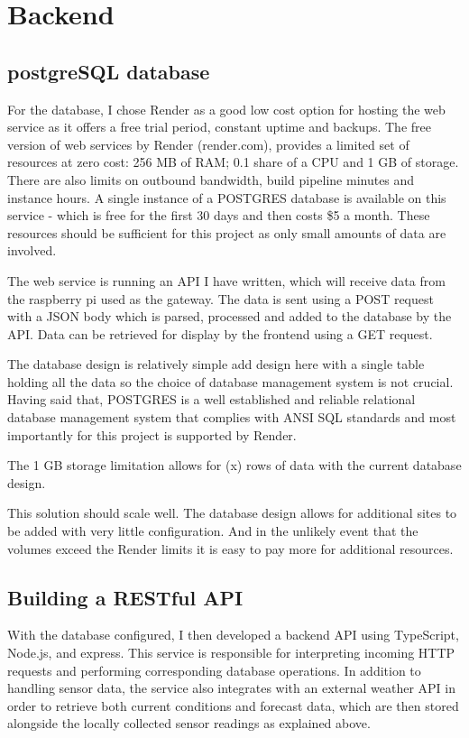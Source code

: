 \section{Backend}

\subsection{postgreSQL database}

For the database, I chose Render as a good low cost option for hosting the web
service as it offers a free trial period, constant uptime and backups. The free
version of web services by Render (render.com), provides a limited set of
resources at zero cost: 256 MB of RAM; 0.1 share of a CPU and 1 GB of storage.
There are also limits on outbound bandwidth, build pipeline minutes and instance
hours. A single instance of a POSTGRES database is available on this service -
which is free for the first 30 days and then costs \$5 a month. These resources
should be sufficient for this project as only small amounts of data are
involved.

The web service is running an API I have written, which will receive data from
the raspberry pi used as the gateway. The data is sent using a POST request with
a JSON body which is parsed, processed and added to the database by the API.
Data can be retrieved for display by the frontend using a GET request.

The database design is relatively simple  add design here with a single table
holding all the data so the choice of database management system is not crucial.
Having said that, POSTGRES is a well established and reliable relational
database management system that complies with ANSI SQL standards and most
importantly for this project is supported by Render.

The 1 GB storage limitation allows for (x) rows of data with the current
database design.

This solution should scale well. The database design allows for additional sites
to be added with very little configuration. And in the unlikely event that the
volumes exceed the Render limits it is easy to pay more for additional
resources.

\subsection{Building a RESTful API}

With the database configured, I then developed a backend API using TypeScript,
Node.js, and express. This service is responsible for interpreting incoming HTTP
requests and performing corresponding database operations. In addition to
handling sensor data, the service also integrates with an external weather API
in order to retrieve both current conditions and forecast data, which are then
stored alongside the locally collected sensor readings as explained above.

